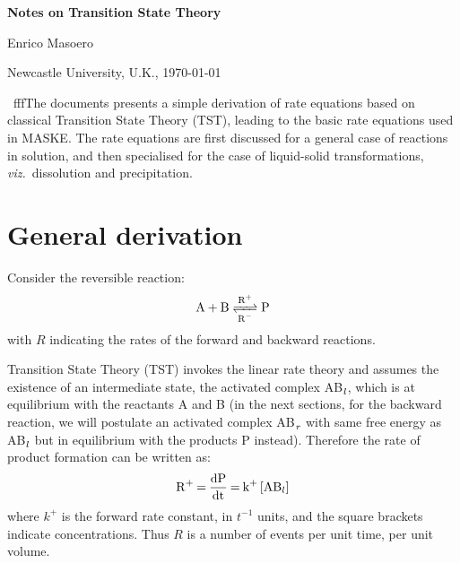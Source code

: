 \documentclass[12pt]{paper}    %
\newcommand{\no}{\noindent}
\newcommand{\viz}{\textit{viz.}~}
\begin{document}
\pagestyle{plain}

\baselineskip 26pt


\begin{center}

{\Large {\bf Notes on Transition State Theory}}

\vskip 2mm

{\Large Enrico Masoero}

Newcastle University, U.K., \today

\end{center}

\baselineskip 16pt

\vskip 2mm
\no {\bf   Abstract}\, {\small fffThe documents presents a simple derivation of rate equations based on classical Transition State Theory (TST), leading to the basic  rate equations used in MASKE. The rate equations are first discussed for a general case of reactions in solution, and then specialised for the case of liquid-solid transformations, \viz dissolution and precipitation.}


\tableofcontents







\section{General derivation} 

Consider the reversible reaction:
%
\begin{equation}
\ce{A + B <=>[R+][R-]
P}
\end{equation}
%
with $R$ indicating the rates of the forward and backward reactions.

Transition State Theory (TST) invokes the linear rate theory and assumes the existence of an intermediate state, the activated complex AB$\ce{_l}$, which is at equilibrium with the reactants A and B (in the next sections, for the backward reaction, we will postulate an activated complex AB$\ce{_r}$ with same free energy as AB$\ce{_l}$ but in equilibrium with the products P instead). Therefore the rate of product formation can be written as:
%
\begin{equation}
\ce{R+ = \frac{dP}{dt} = k+ [AB_l]}
\end{equation}
%
where $k^+$ is the forward rate constant, in $t^{-1}$ units, and the square brackets indicate concentrations. Thus $R$ is a number of events per unit time, per unit volume.
\end{document}
